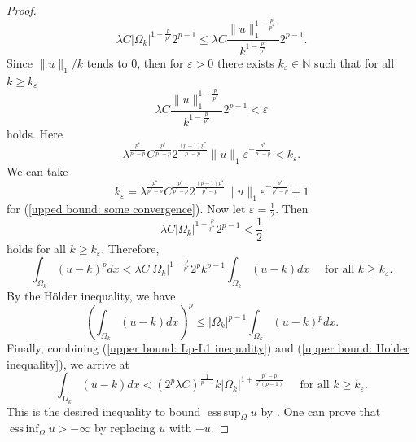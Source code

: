 \documentclass[a4paper,12pt,reqno]{amsart}
\renewcommand\eqref[1]{(\ref{#1})} %
\numberwithin{equation}{section}
\theoremstyle{plain}
\theoremstyle{definition}
\DeclareMathOperator*{\esssup}{ess\,sup}
\DeclareMathOperator*{\essinf}{ess\,inf}
\begin{document}
\begin{proof}
\begin{equation*}
\lambda C \left|\Omega_{k}\right|^{1-\frac{p}{p^{*}}} 2^{p-1} \leq  \lambda C \frac{\|u\|_{1}^{1-\frac{p}{p^{*}}}}{k^{1-\frac{p}{p^{*}}}}2^{p-1}.
\end{equation*}
Since $\|u\|_{1}/k$ tends to $0$, then  for $\varepsilon>0$ there exists $k_{\varepsilon}\in \mathbb{N}$ such that for all $k\geq k_{\varepsilon}$
\begin{equation}\label{upped bound: some convergence}
\lambda C \frac{\|u\|_{1}^{1-\frac{p}{p^{*}}}}{k^{1-\frac{p}{p^{*}}}}2^{p-1}  < \varepsilon
\end{equation}
holds. Here 
\begin{equation*}
 \lambda^{{\frac{p^{*}}{ p^{*}-p}}}C^{{\frac{p^{*}}{ p^{*}-p}}}2^{\frac{(p-1)p^{*}}{ p^{*}-p}}\|u\|_{1} \varepsilon^{-\frac{p^{*}}{ p^{*}-p}}< k_{\varepsilon}.
\end{equation*}
We can take 
$$k_{\varepsilon}= \lambda^{{\frac{p^{*}}{ p^{*}-p}}}C^{{\frac{p^{*}}{ p^{*}-p}}}2^{\frac{(p-1)p^{*}}{ p^{*}-p}} \|u\|_{1} \varepsilon^{-\frac{p^{*}}{ p^{*}-p}}+1$$ 
for \eqref{upped bound: some convergence}. Now let $\varepsilon=\frac{1}{2}$.  Then 
\begin{equation*}
 \lambda C \left|\Omega_{k}\right|^{1-\frac{p}{p^{*}}}2^{p-1} < \frac{1}{2}    
\end{equation*}
holds for all $k \geq k_{\varepsilon}$. Therefore,
\begin{equation}\label{upper bound: Lp-L1 inequality}
\int_{\Omega_{k}}(u-k)^{p} d x <\lambda C\left|\Omega_{k}\right|^{1-\frac{p}{p^{*}}}2^{p} k^{p-1}  \int_{\Omega_{k}}(u-k) d x  \quad \text{ for all } k \geq k_{\varepsilon}.
\end{equation}
By the H\"older inequality, we have
\begin{equation}\label{upper bound: Holder inequality}
\left(\int_{\Omega_{k}}(u-k) d x \right)^{p}\leq |\Omega_{k}|^{p-1}   \int_{\Omega_{k}}(u-k)^{p} d x.
\end{equation}
Finally, combining \eqref{upper bound: Lp-L1 inequality} and \eqref{upper bound: Holder inequality}, we arrive at
\begin{equation}\label{upper bound: desired inequality}
\int_{\Omega_{k}}(u-k) d x <  (2^{p}\lambda C)^{\frac{1}{p-1}} k\left|\Omega_{k}\right|^{1+\frac{p^{*}-p}{p^{*}(p-1)}} \quad \text{ for all } k \geq k_{\varepsilon}.  
\end{equation}
This is the desired inequality to bound $\esssup_{\Omega}u$ by  \cite[Lemma 5.1, p. 71]{Ladyzhenskaya1968}. One can prove that $\essinf_{\Omega}u>-\infty$ by replacing $u$ with $-u$.
\end{proof}
\end{document}
